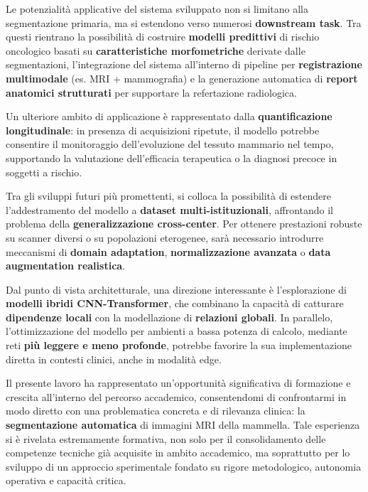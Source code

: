 
Le potenzialità applicative del sistema sviluppato non si limitano alla segmentazione primaria, ma si estendono verso numerosi \textbf{downstream task}. Tra questi rientrano la possibilità di costruire \textbf{modelli predittivi} di rischio oncologico basati su \textbf{caratteristiche morfometriche} derivate dalle segmentazioni, l’integrazione del sistema all’interno di pipeline per \textbf{registrazione multimodale} (es. MRI + mammografia) e la generazione automatica di \textbf{report anatomici strutturati} per supportare la refertazione radiologica.

Un ulteriore ambito di applicazione è rappresentato dalla \textbf{quantificazione longitudinale}: in presenza di acquisizioni ripetute, il modello potrebbe consentire il monitoraggio dell’evoluzione del tessuto mammario nel tempo, supportando la valutazione dell’efficacia terapeutica o la diagnosi precoce in soggetti a rischio.


Tra gli sviluppi futuri più promettenti, si colloca la possibilità di estendere l’addestramento del modello a \textbf{dataset multi-istituzionali}, affrontando il problema della \textbf{generalizzazione cross-center}. Per ottenere prestazioni robuste su scanner diversi o su popolazioni eterogenee, sarà necessario introdurre meccanismi di \textbf{domain adaptation}, \textbf{normalizzazione avanzata} o \textbf{data augmentation realistica}.

Dal punto di vista architetturale, una direzione interessante è l’esplorazione di \textbf{modelli ibridi CNN-Transformer}, che combinano la capacità di catturare \textbf{dipendenze locali} con la modellazione di \textbf{relazioni globali}. In parallelo, l’ottimizzazione del modello per ambienti a bassa potenza di calcolo, mediante reti \textbf{più leggere e meno profonde}, potrebbe favorire la sua implementazione diretta in contesti clinici, anche in modalità edge.




Il presente lavoro ha rappresentato un'opportunità significativa di formazione e crescita all’interno del percorso accademico, consentendomi di confrontarmi in modo diretto con una problematica concreta e di rilevanza clinica: la \textbf{segmentazione automatica} di immagini MRI della mammella. Tale esperienza si è rivelata estremamente formativa, non solo per il consolidamento delle competenze tecniche già acquisite in ambito accademico, ma soprattutto per lo sviluppo di un approccio sperimentale fondato su rigore metodologico, autonomia operativa e capacità critica.

